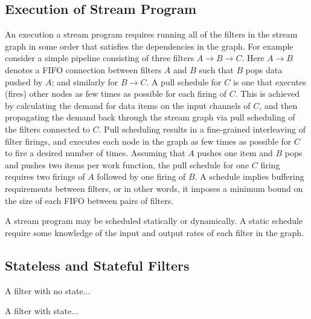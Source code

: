 \subsection{Execution of Stream Program}

An execution a stream program requires running all of the filters in
the stream graph in some order that satisfies the dependencies in the
graph. For example consider a simple pipeline consisting of three
filters $A\rightarrow B\rightarrow C$. Here $A\rightarrow B$ denotes a
FIFO connection between filters $A$ and $B$ such that $B$ pops data
pushed by $A$; and similarly for $B\rightarrow C$. A pull schedule for
$C$ is one that executes (fires) other nodes as few times as possible
for each firing of $C$. This is achieved by calculating the demand for
data items on the input channels of $C$, and then propagating the
demand back through the stream graph via pull scheduling of the
filters connected to $C$. Pull scheduling results in a fine-grained
interleaving of filter firings, and executes each node in the graph as
few times as possible for $C$ to fire a desired number of times.
Assuming that $A$ pushes one item and $B$ pops and pushes two items
per work function, the pull schedule for one $C$ firing requires two
firings of $A$ followed by one firing of $B$. A schedule implies
buffering requirements between filters, or in other words, it imposes
a minimum bound on the size of each FIFO between pairs of filters.

A stream program may be scheduled statically or dynamically. A static
schedule require some knowledge of the input and output rates of each
filter in the graph.

\subsection{Stateless and Stateful Filters}

A filter with no state...

A filter with state...